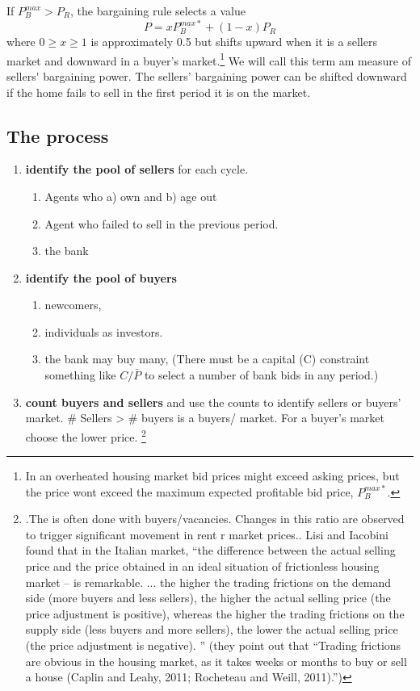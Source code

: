 If $P_B^{max}>P_R$,  the bargaining rule selects a value 
\[P = xP_B^{max*}+(1-x)P_R\]
where $0\ge x\ge 1$ is approximately 0.5 but shifts upward when it is a sellers market and downward in a buyer's market.\footnote{In an overheated housing market bid prices might exceed asking prices, but the price wont exceed the maximum expected profitable bid price, $P_B^{max*}$.} We will call this term am measure of \gls{sellers' bargaining power}.  The sellers' bargaining power can be shifted downward if the home fails to sell in the first period it is on the market. 

\subsection{The process}
\begin{enumerate}
\item \textbf{identify the pool of sellers} for each cycle.
    \begin{enumerate}
        \item Agents who a) own and b) age out
        \item Agent  who failed to sell in the previous period.
        \item the bank
    \end{enumerate}
\item \textbf{identify the pool of buyers} 
    \begin{enumerate}
         \item newcomers, 
         \item individuals as investors.
         \item the bank may buy many, (There must be a capital (C) constraint something like $C/\bar P$ to select a number of bank bids in any period.)
    \end{enumerate}

\item \textbf{count buyers and sellers} and use the counts to identify sellers or buyers' market. \# Sellers > \# buyers is a buyers/ market. For a buyer's market  choose the lower price. \footnote{.The is often done with buyers/vacancies. Changes in this ratio are observed to trigger significant movement in rent r market prices.\cite{wheatonVacancySearchPrices1990}. Lisi and Iacobini \cite{lisiEstimatingHousingPrice2015} found  that in the Italian market, ``the difference between the actual selling price and the price obtained in an ideal situation of frictionless housing market – is remarkable. ... the higher the trading frictions on the demand side (more buyers and less sellers), the higher the actual selling price (the price adjustment is positive), whereas the higher the trading frictions on the supply side (less buyers and more sellers), the lower the actual selling price (the price adjustment is negative). '' (they point out that ``Trading frictions are obvious in the housing market, as it takes weeks or months to buy or sell a house (Caplin and Leahy, 2011; Rocheteau and Weill, 2011).'')}  


\end{enumerate}
